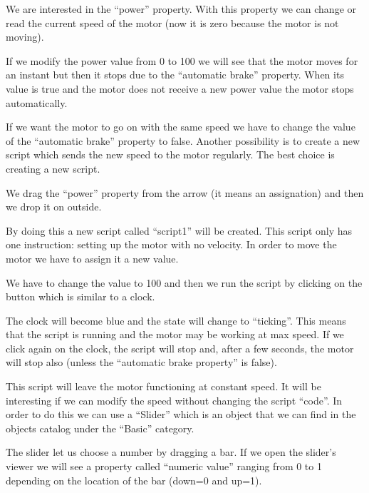 \documentclass[english]{etoys-guide}
\begin{document}
We are interested in the “power” property. With this property we can change or
read the current speed of the motor (now it is zero because the motor is not
moving).




If we modify the power value from 0 to 100 we will see that the motor moves for
an instant but then it stops due to the “automatic brake” property. When its
value is true and the motor does not receive a new power value the motor stops
automatically.

If we want the motor to go on with the same speed we have to change the value
of the “automatic brake” property to false. Another possibility is to create a
new script which sends the new speed to the motor regularly. The best choice is
creating a new script. 

We drag the “power” property from the arrow (it means an assignation) and then
we drop it on outside. 


By doing this a new script called “script1” will be created. This script only
has one instruction: setting up the motor with no velocity. In order to move
the motor we have to assign it a new value.



We have to change the value to 100 and then we run the script by clicking on
the button which is similar to a clock.





The clock will become blue and the state will change to “ticking”. This means
that the script is running and the motor may be working at max speed. If we
click again on the clock, the script will stop and, after a few seconds, the
motor will stop also (unless the “automatic brake property” is false).

This script will leave the motor functioning at constant speed. It will be
interesting if we can modify the speed without changing the script “code”. In
order to do this we can use a “Slider” which is an object that we can find in
the objects catalog under the “Basic” category. 



The slider let us choose a number by dragging a bar. If we open the slider’s
viewer we will see a property called “numeric value” ranging from 0 to 1
depending on the location of the bar (down=0 and up=1).
\end{document}
